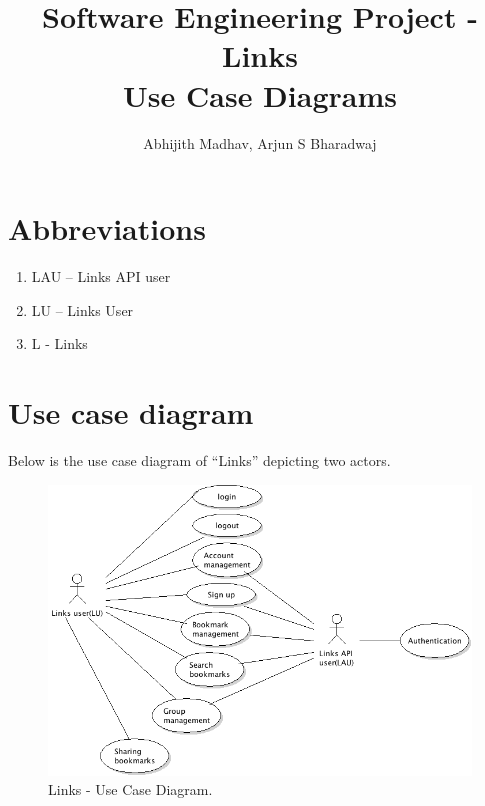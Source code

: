 \documentclass[11pt]{report} %
\title{Software Engineering Project - Links \\Use Case Diagrams}
\author{Abhijith Madhav, Arjun S Bharadwaj}
\begin{document}
\maketitle
\section*{Abbreviations}
\begin{enumerate}
	\item
		LAU – Links API user
	\item
		LU – Links User
	\item
		L - Links
\end{enumerate}

\maketitle
\section*{Use case diagram}
Below is the use case diagram of “Links” depicting two actors.
\begin{figure}[h]
\centering
        \includegraphics[width=\textwidth]{usecase}
    \caption{{Links - Use Case Diagram}.}
    \label{fig:Use Case Diagram}
\end{figure}


\maketitle
\end{document}
